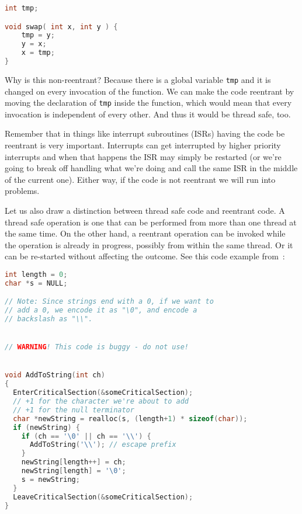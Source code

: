 \begin{lstlisting}[language=C]
int tmp;

void swap( int x, int y ) {
    tmp = y;
    y = x;
    x = tmp;
}
\end{lstlisting}

Why is this non-reentrant? Because there is a global variable \texttt{tmp} and it is changed on every invocation of the function. We can make the code reentrant by moving the declaration of \texttt{tmp} inside the function, which would mean that every invocation is independent of every other. And thus it would be thread safe, too.

Remember that in things like interrupt subroutines (ISRs) having the code be reentrant is very important. Interrupts can get interrupted by higher priority interrupts and when that happens the ISR may simply be restarted (or we're going to break off handling what we're doing and call the same ISR in the middle of the current one). Either way, if the code is not reentrant we will run into problems.

Let us also draw a distinction between thread safe code and reentrant code. A thread safe operation is one that can be performed from more than one thread at the same time. On the other hand, a reentrant operation can be invoked while the operation is already in progress, possibly from within the same thread. Or it can be re-started without affecting the outcome. See this code example from~\cite{tont:threadsafe}:

\begin{lstlisting}[language=C]
int length = 0;
char *s = NULL;

// Note: Since strings end with a 0, if we want to
// add a 0, we encode it as "\0", and encode a
// backslash as "\\".


// WARNING! This code is buggy - do not use!


void AddToString(int ch)
{
  EnterCriticalSection(&someCriticalSection);
  // +1 for the character we're about to add
  // +1 for the null terminator
  char *newString = realloc(s, (length+1) * sizeof(char));
  if (newString) {
    if (ch == '\0' || ch == '\\') {
      AddToString('\\'); // escape prefix
    }
    newString[length++] = ch;
    newString[length] = '\0';
    s = newString;
  }
  LeaveCriticalSection(&someCriticalSection);
}
\end{lstlisting}

